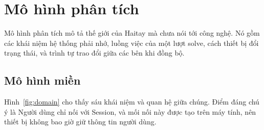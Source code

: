\section{Mô hình phân tích}
\label{sec:analysis}
Mô hình phân tích mô tả thế giới của Haitay mà chưa nói tới công nghệ. Nó gồm các khái niệm hệ thống phải nhớ, luồng việc của một lượt solve, cách thiết bị đổi trạng thái, và trình tự trao đổi giữa các bên khi đồng bộ.

\subsection{Mô hình miền}
Hình~\ref{fig:domain} cho thấy sáu khái niệm và quan hệ giữa chúng. Điểm đáng chú ý là Người dùng chỉ nối với Session, và mối nối này được tạo trên máy tính, nên thiết bị không bao giờ giữ thông tin người dùng.


